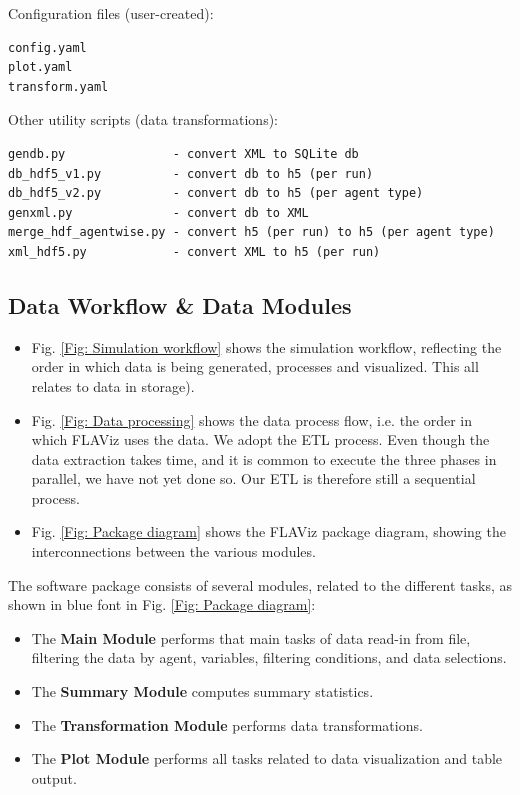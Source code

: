 \documentclass[10pt,a4paper]{article}
\begin{document}
Configuration files (user-created):
\begin{verbatim}
config.yaml
plot.yaml
transform.yaml
\end{verbatim}

Other utility scripts (data transformations):
\begin{verbatim}
gendb.py               - convert XML to SQLite db
db_hdf5_v1.py          - convert db to h5 (per run)
db_hdf5_v2.py          - convert db to h5 (per agent type)
genxml.py              - convert db to XML
merge_hdf_agentwise.py - convert h5 (per run) to h5 (per agent type)
xml_hdf5.py            - convert XML to h5 (per run)
\end{verbatim}


\subsection{Data Workflow \& Data Modules}

\begin{itemize}
\item Fig. \ref{Fig: Simulation workflow} shows the simulation workflow, reflecting the order in which data is being generated, processes and visualized. This all relates to data in storage).

\item Fig. \ref{Fig: Data processing} shows the data process flow, i.e. the order in which FLAViz uses the data. We adopt the ETL process. Even though the data extraction takes time, and it is common to execute the three phases in parallel, we have not yet done so. Our ETL is therefore still a sequential process.

\item Fig. \ref{Fig: Package diagram} shows the FLAViz package diagram, showing the interconnections between the various modules.
\end{itemize}

The software package consists of several modules, related to the different tasks, as shown in blue font in Fig. \ref{Fig: Package diagram}:

\begin{itemize}
\item The \textbf{Main Module} performs that main tasks of data read-in from file, filtering the data by agent, variables, filtering conditions, and data selections.

\item The \textbf{Summary Module} computes summary statistics.

\item The \textbf{Transformation Module} performs data transformations.

\item The \textbf{Plot Module} performs all tasks related to data visualization and table output.
\end{itemize}
\end{document}
